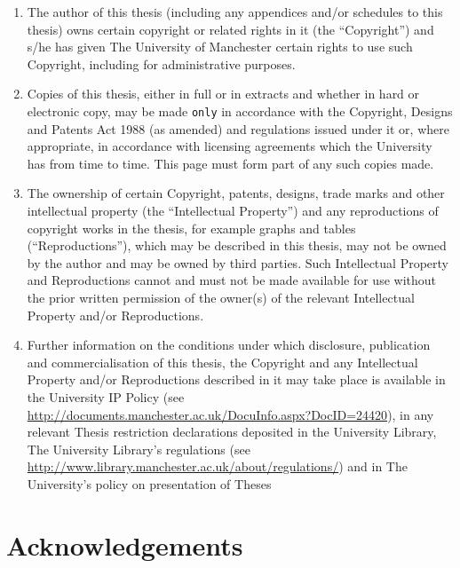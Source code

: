 \begin{enumerate}
    \item The author of this thesis (including any appendices and/or schedules to this thesis) owns certain copyright or related rights in it (the “Copyright”) and s/he has given The University of Manchester certain rights to use such Copyright, including for administrative purposes.

    \item Copies of this thesis, either in full or in extracts and whether in
    hard or electronic copy, may be made \texttt{only} in accordance with the Copyright, Designs and Patents Act 1988 (as amended) and regulations issued under it or, where appropriate, in accordance with licensing agreements which the University has from time to time. This page must form part of any such copies made.

    \item The ownership of certain Copyright, patents, designs, trade marks and other intellectual property (the “Intellectual Property”) and any reproductions of copyright works in the thesis, for example graphs and tables (“Reproductions”), which may be described in this thesis, may not be owned by the author and may be owned by third parties. Such Intellectual Property and Reproductions cannot and must not be made available for use without the prior written permission of the owner(s) of the relevant Intellectual Property and/or Reproductions.

    \item Further information on the conditions under which disclosure,
        publication and commercialisation of this thesis, the Copyright and any
        Intellectual Property and/or Reproductions described in it may take
        place is available in the University IP Policy (see
        \href{http://documents.manchester.ac.uk/DocuInfo.aspx?DocID=24420}{\url{http://documents.manchester.ac.uk/DocuInfo.aspx?DocID=24420}}),
        in any relevant Thesis restriction declarations deposited in the
        University Library, The University Library’s regulations (see
        \href{http://www.library.manchester.ac.uk/about/regulations/}{\url{http://www.library.manchester.ac.uk/about/regulations/}}) and in The University’s policy on presentation of Theses
\end{enumerate}

\clearpage

\section*{Acknowledgements}

